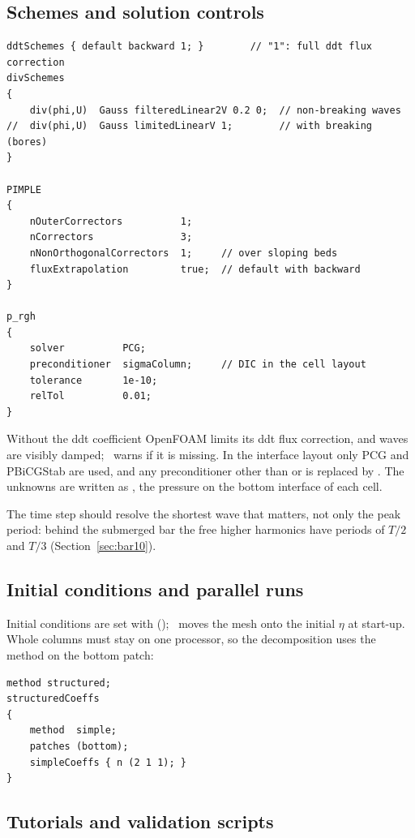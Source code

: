 \subsection{Schemes and solution controls}

\begin{verbatim}
ddtSchemes { default backward 1; }        // "1": full ddt flux correction
divSchemes
{
    div(phi,U)  Gauss filteredLinear2V 0.2 0;  // non-breaking waves
//  div(phi,U)  Gauss limitedLinearV 1;        // with breaking (bores)
}

PIMPLE
{
    nOuterCorrectors          1;
    nCorrectors               3;
    nNonOrthogonalCorrectors  1;     // over sloping beds
    fluxExtrapolation         true;  // default with backward
}

p_rgh
{
    solver          PCG;
    preconditioner  sigmaColumn;     // DIC in the cell layout
    tolerance       1e-10;
    relTol          0.01;
}
\end{verbatim}

Without the ddt coefficient OpenFOAM limits its ddt flux correction, and waves
are visibly damped; \NHFOAM\ warns if it is missing. In the interface layout
only PCG and PBiCGStab are used, and any preconditioner other than
 or  is replaced by . The unknowns
are written as , the pressure on the bottom interface of each cell.

The time step should resolve the shortest wave that matters, not only the
peak period: behind the submerged bar the free higher harmonics have periods
of $T/2$ and $T/3$ (Section~\ref{sec:bar10}).

\subsection{Initial conditions and parallel runs}

Initial conditions are set with 
(); \NHFOAM\ moves the mesh onto the initial
$\eta$ at start-up. Whole columns must stay on one processor, so the
decomposition uses the  method on the bottom patch:
\begin{verbatim}
method structured;
structuredCoeffs
{
    method  simple;
    patches (bottom);
    simpleCoeffs { n (2 1 1); }
}
\end{verbatim}

\subsection{Tutorials and validation scripts}


